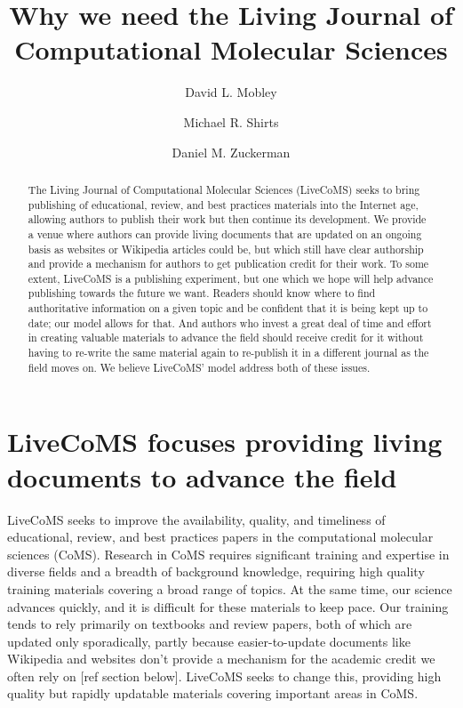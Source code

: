 \documentclass[9pt,lineno]{livecoms}
\title{Why we need the Living Journal of Computational Molecular Sciences}
\author[1*]{David L. Mobley}
\author[2*]{Michael R. Shirts}
\author[3*]{Daniel M. Zuckerman}
\affil[1]{Department of Pharmaceutical Sciences and Chemistry, University of California, Irvine}
\affil[2]{Department of Chemical Engineering, University of Colorado, Boulder}
\affil[2]{Department of Biomedical Engineering, Oregon Health Sciences University}
\begin{document}
\maketitle

\begin{abstract}
The Living Journal of Computational Molecular Sciences (LiveCoMS) seeks to bring publishing of educational, review, and best practices materials into the Internet age, allowing authors to publish their work but then continue its development.
We provide a venue where authors can provide living documents that are updated on an ongoing basis as websites or Wikipedia articles could be, but which still have clear authorship and provide a mechanism for authors to get publication credit for their work.
To some extent, LiveCoMS is a publishing experiment, but one which we hope will help advance publishing towards the future we want.
Readers should know where to find authoritative information on a given topic and be confident that it is being kept up to date; our model allows for that. 
And authors who invest a great deal of time and effort in creating valuable materials to advance the field should receive credit for it without having to re-write the same material again to re-publish it in a different journal as the field moves on. 
We believe LiveCoMS' model address both of these issues.
\end{abstract}


\section{LiveCoMS focuses providing living documents to advance the field}

LiveCoMS seeks to improve the availability, quality, and timeliness of educational, review, and best practices papers in the computational molecular sciences (CoMS).
Research in CoMS requires significant training and expertise in diverse fields and a breadth of background knowledge, requiring high quality training materials covering a broad range of topics.
At the same time, our science advances quickly, and it is difficult for these materials to keep pace. 
Our training tends to rely primarily on textbooks and review papers, both of which are updated only sporadically, partly because easier-to-update documents like Wikipedia and websites don't provide a mechanism for the academic credit we often rely on [ref section below].
LiveCoMS seeks to change this, providing high quality but rapidly updatable materials covering important areas in CoMS.
\end{document}
